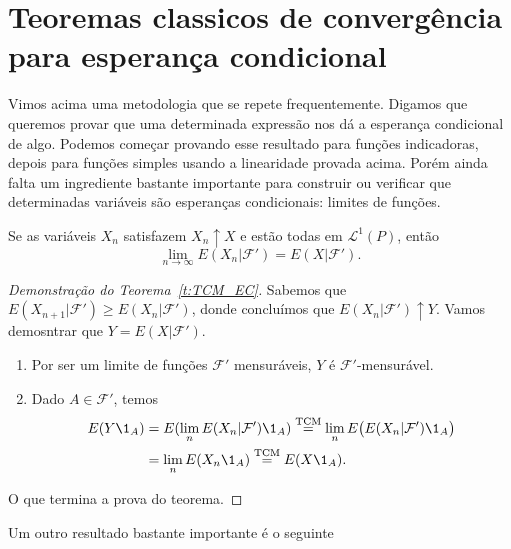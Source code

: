 \section{Teoremas classicos de convergência para esperança condicional}

Vimos acima uma metodologia que se repete frequentemente.
Digamos que queremos provar que uma determinada expressão nos dá a esperança condicional de algo.
Podemos começar provando esse resultado para funções indicadoras, depois para funções simples usando a linearidade provada acima.
Porém ainda falta um ingrediente bastante importante para construir ou verificar que determinadas variáveis são esperanças condicionais: limites de funções.

\begin{theorem}
  \label{t:TCM_EC}
  Se as variáveis $X_n$ satisfazem $X_n \uparrow X$ e estão todas em $\mathcal{L}^1(P)$, então
  \begin{equation}
    \lim_{n\to \infty} E(X_n|\mathcal{F}') = E(X|\mathcal{F}').
  \end{equation}
\end{theorem}

\begin{proof}[Demonstração do Teorema~\ref{t:TCM_EC}]
  Sabemos que $E(X_{n+1} | \mathcal{F}') \geq E(X_n|\mathcal{F}')$, donde concluímos que $E(X_n|\mathcal{F}') \uparrow Y$.
  Vamos demosntrar que $Y = E(X|\mathcal{F}')$.
  \begin{enumerate}[\quad a)]
  \item Por ser um limite de funções $\mathcal{F}'$ mensuráveis, $Y$ é $\mathcal{F}'$-mensurável.
  \item Dado $A \in \mathcal{F}'$, temos
    \begin{equation}
      \begin{split}
        E(Y \1_A) & = E(\lim_n E(X_n |\mathcal{F}') \1_A) \overset{\text{TCM}}= \lim_n E\big( E(X_n|\mathcal{F}') \1_A \big)\\
        & = \lim_n E(X_n \1_A) \overset{\text{TCM}}= E(X \1_A).
      \end{split}
    \end{equation}
  \end{enumerate}
  O que termina a prova do teorema.
\end{proof}

Um outro resultado bastante importante é o seguinte

